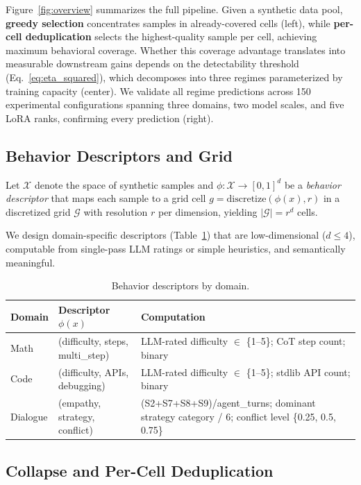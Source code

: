 \documentclass{article}
\theoremstyle{plain}
\theoremstyle{remark}
\begin{document}
Figure~\ref{fig:overview} summarizes the full pipeline.
Given a synthetic data pool, \textbf{greedy selection} concentrates samples in already-covered cells (left), while \textbf{per-cell deduplication} selects the highest-quality sample per cell, achieving maximum behavioral coverage.
Whether this coverage advantage translates into measurable downstream gains depends on the detectability threshold (Eq.~\ref{eq:eta_squared}), which decomposes into three regimes parameterized by training capacity (center).
We validate all regime predictions across 150 experimental configurations spanning three domains, two model scales, and five LoRA ranks, confirming every prediction (right).



\subsection{Behavior Descriptors and Grid}

Let $\mathcal{X}$ denote the space of synthetic samples and $\phi: \mathcal{X} \to [0,1]^d$ be a \emph{behavior descriptor} that maps each sample to a grid cell $g = \text{discretize}(\phi(x), r)$ in a discretized grid $\mathcal{G}$ with resolution $r$ per dimension, yielding $|\mathcal{G}| = r^d$ cells.

We design domain-specific descriptors (Table~\ref{tab:descriptors}) that are low-dimensional ($d{\leq}4$), computable from single-pass LLM ratings or simple heuristics, and semantically meaningful.


\begin{table}[h]
\centering
\caption{Behavior descriptors by domain.}
\label{tab:descriptors}
\begin{tabular}{llp{5.5cm}}
\toprule
\textbf{Domain} & \textbf{Descriptor $\phi(x)$} & \textbf{Computation} \\
\midrule
Math & (difficulty, steps, multi\_step) & LLM-rated difficulty $\in$ \{1--5\}; CoT step count; binary \\
Code & (difficulty, APIs, debugging) & LLM-rated difficulty $\in$ \{1--5\}; stdlib API count; binary \\
Dialogue & (empathy, strategy, conflict) & (S2+S7+S8+S9)/agent\_turns; dominant strategy category / 6; conflict level \{0.25, 0.5, 0.75\} \\
\bottomrule
\end{tabular}
\end{table}

\subsection{Collapse and Per-Cell Deduplication}
\end{document}

